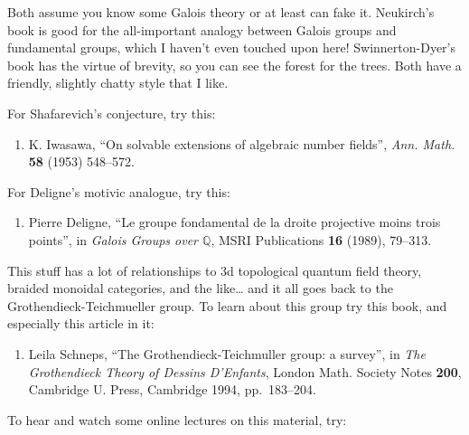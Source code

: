 \documentclass{article}
\def\tightlist{}
\renewcommand{\texttt}[1]{%
  \begingroup
  \ttfamily
  \begingroup\lccode`~=`/\lowercase{\endgroup\def~}{/\discretionary{}{}{}}%
  \begingroup\lccode`~=`[\lowercase{\endgroup\def~}{[\discretionary{}{}{}}%
  \begingroup\lccode`~=`.\lowercase{\endgroup\def~}{.\discretionary{}{}{}}%
  \catcode`/=\active\catcode`[=\active\catcode`.=\active
  \scantokens{#1\noexpand}%
  \endgroup
}
\begin{document}
Both assume you know some Galois theory or at least can fake it.
Neukirch's book is good for the all-important analogy between Galois
groups and fundamental groups, which I haven't even touched upon here!
Swinnerton-Dyer's book has the virtue of brevity, so you can see the
forest for the trees. Both have a friendly, slightly chatty style that I
like.

For Shafarevich's conjecture, try this:

\begin{enumerate}
\def\labelenumi{\arabic{enumi})}
\setcounter{enumi}{3}
\tightlist
\item
  K. Iwasawa, ``On solvable extensions of algebraic number fields'',
  \emph{Ann. Math.} \textbf{58} (1953) 548--572.
\end{enumerate}

For Deligne's motivic analogue, try this:

\begin{enumerate}
\def\labelenumi{\arabic{enumi})}
\setcounter{enumi}{4}
\tightlist
\item
  Pierre Deligne, ``Le groupe fondamental de la droite projective moins
  trois points'', in \emph{Galois Groups over \(\mathbb{Q}\)}, MSRI
  Publications \textbf{16} (1989), 79--313.
\end{enumerate}

This stuff has a lot of relationships to 3d topological quantum field
theory, braided monoidal categories, and the like\ldots{} and it all
goes back to the Grothendieck-Teichmueller group. To learn about this
group try this book, and especially this article in it:

\begin{enumerate}
\def\labelenumi{\arabic{enumi})}
\setcounter{enumi}{5}
\tightlist
\item
  Leila Schneps, ``The Grothendieck-Teichmuller group: a survey'', in
  \emph{The Grothendieck Theory of Dessins D'Enfants}, London Math.
  Society Notes \textbf{200}, Cambridge U. Press, Cambridge 1994,
  pp.~183--204.
\end{enumerate}

To hear and watch some online lectures on this material, try:

\end{document}

